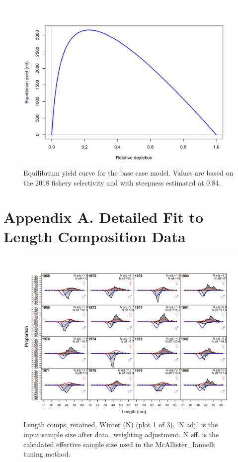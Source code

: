 \documentclass[12pt,]{article}
\begin{document}
\FloatBarrier

\begin{figure}
\centering
\includegraphics{r4ss/plots_mod1/yield1_yield_curve.png}
\caption{Equilibrium yield curve for the base case model. Values are
based on the 2018 fishery selectivity and with steepness estimated at
0.84. \label{fig:yield}}
\end{figure}

\FloatBarrier

\newpage

\FloatBarrier
\newpage

\section{Appendix A. Detailed Fit to Length Composition
Data}\label{appendix-a.-detailed-fit-to-length-composition-data}

\begin{figure}
\centering
\includegraphics{r4ss/plots_mod1/comp_lenfit_flt1mkt2_page1.png}
\caption{Length comps, retained, Winter (N) (plot 1 of 3). `N adj.' is
the input sample size after data\_weighting adjustment. N eff. is the
calculated effective sample size used in the McAllister\_Iannelli tuning
method. \label{fig:length_fits}}
\end{figure}
\end{document}
